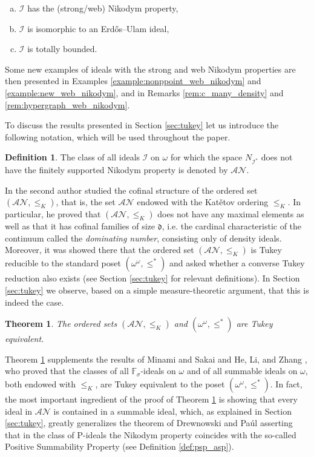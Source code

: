 \documentclass[a4paper,11pt,fleqn]{amsart}
\newtheorem{theoreml}{Theorem}[section]
\theoremstyle{definition}
\newtheorem{definition}[theorem]{Definition}
\theoremstyle{remark}
\numberwithin{equation}{section}
\newcommand{\frakd}{\mathfrak{d}}
\newcommand{\aA}{\mathcal{A}}
\newcommand{\iI}{\mathcal{I}}
\newcommand{\nN}{\mathcal{N}}
\newcommand{\erdos}{{Erd\H{o}s}}
\begin{document}
\begin{enumerate}[(a)]
    \item $\iI$ has the (strong/web) Nikodym property,
    \item $\iI$ is isomorphic to an \erdos--Ulam ideal,
    \item $\iI$ is totally bounded.
\end{enumerate}
Some new examples of ideals with the strong and web Nikodym properties are then presented in Examples \ref{example:nonppoint_web_nikodym} and \ref{example:new_web_nikodym}, and in Remarks \ref{rem:c_many_density} and \ref{rem:hypergraph_web_nikodym}. 

\medskip

To discuss the results presented in Section \ref{sec:tukey} let us introduce the following notation, which will be used throughout the paper.

\begin{definition}\label{def:class_an}
    The class of all ideals $\iI$ on $\omega$ for which the space $N_{\iI^*}$ does not have the finitely supported Nikodym property is denoted by $\aA\nN$.
\end{definition}

In \cite{Zuc25} the second author studied the cofinal structure of the ordered set $(\aA\nN,\le_K)$, that is, the set $\aA\nN$ endowed with the Kat\v{e}tov ordering $\le_K$. In particular, he proved that $(\aA\nN,\le_K)$ does not have any maximal elements as well as that it has cofinal families of size $\frakd$, i.e. the cardinal characteristic of the continuum called the \textit{dominating number}, consisting only of density ideals. Moreover, it was showed there that the ordered set $(\aA\nN,\le_K)$ is Tukey reducible to the standard poset $(\omega^\omega,\le^*)$ and asked whether a converse Tukey reduction also exists (see Section \ref{sec:tukey} for relevant definitions). In Section \ref{sec:tukey} we observe, based on a simple measure-theoretic argument, that this is indeed the case.

\begin{theoreml}\label{thm:main_tukey}
    The ordered sets $(\aA\nN,\le_K)$ and $(\omega^\omega,\le^*)$ are Tukey equivalent.
\end{theoreml}

Theorem \ref{thm:main_tukey} supplements the results of Minami and Sakai \cite{MS16} and He, Li, and Zhang \cite{HLZ}, who proved that the classes of all $\mathbb{F}_\sigma$-ideals on $\omega$ and of all summable ideals on $\omega$, both endowed with $\le_K$, are Tukey equivalent to the poset $(\omega^\omega,\le^*)$. In fact, the most important ingredient of the proof of Theorem \ref{thm:main_tukey} is showing that every ideal in $\mathcal{AN}$ is contained in a summable ideal, which, as explained in Section \ref{sec:tukey}, greatly generalizes the theorem of Drewnowski and Pa\'ul \cite{DP00} asserting that in the class of P-ideals the Nikodym property coincides with the so-called Positive Summability Property (see Definition \ref{def:psp_asp}).
\end{document}
